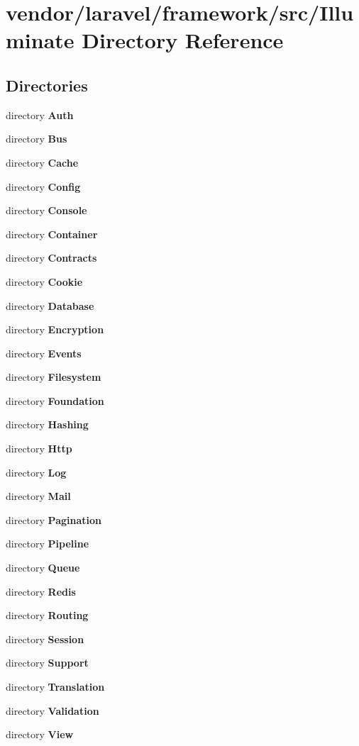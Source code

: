 \section{vendor/laravel/framework/src/\+Illuminate Directory Reference}
\label{dir_a606aa34dba4977371488af54109a42d}
\subsection*{Directories}
\begin{DoxyCompactItemize}
\item 
directory {\bf Auth}
\item 
directory {\bf Bus}
\item 
directory {\bf Cache}
\item 
directory {\bf Config}
\item 
directory {\bf Console}
\item 
directory {\bf Container}
\item 
directory {\bf Contracts}
\item 
directory {\bf Cookie}
\item 
directory {\bf Database}
\item 
directory {\bf Encryption}
\item 
directory {\bf Events}
\item 
directory {\bf Filesystem}
\item 
directory {\bf Foundation}
\item 
directory {\bf Hashing}
\item 
directory {\bf Http}
\item 
directory {\bf Log}
\item 
directory {\bf Mail}
\item 
directory {\bf Pagination}
\item 
directory {\bf Pipeline}
\item 
directory {\bf Queue}
\item 
directory {\bf Redis}
\item 
directory {\bf Routing}
\item 
directory {\bf Session}
\item 
directory {\bf Support}
\item 
directory {\bf Translation}
\item 
directory {\bf Validation}
\item 
directory {\bf View}
\end{DoxyCompactItemize}
